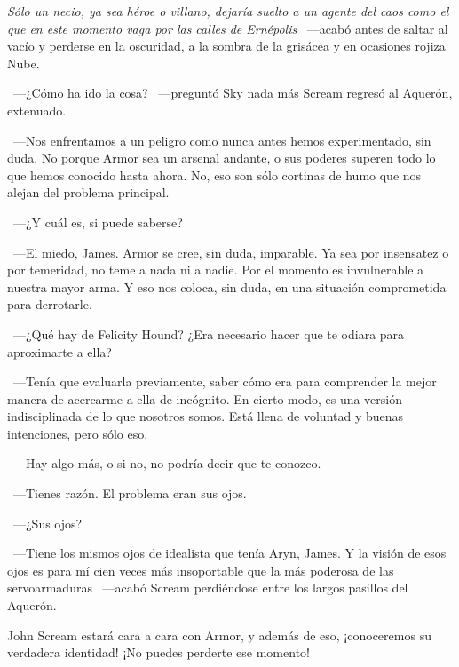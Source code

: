 \emph{Sólo un necio, ya sea héroe o villano, dejaría suelto a un agente del caos como el que en este momento vaga por las calles de Ernépolis} ~---acabó antes de saltar al vacío y perderse en la oscuridad, a la sombra de la grisácea y en ocasiones rojiza Nube.

\bigskip\noindent
~---¿Cómo ha ido la cosa? ~---preguntó Sky nada más Scream regresó al Aquerón, extenuado.

~---Nos enfrentamos a un peligro como nunca antes hemos experimentado, sin duda. No porque Armor sea un arsenal andante, o sus poderes superen todo lo que hemos conocido hasta ahora. No, eso son sólo cortinas de humo que nos alejan del problema principal.

~---¿Y cuál es, si puede saberse?

~---El miedo, James. Armor se cree, sin duda, imparable. Ya sea por insensatez o por temeridad, no teme a nada ni a nadie. Por el momento es invulnerable a nuestra mayor arma. Y eso nos coloca, sin duda, en una situación comprometida para derrotarle.

~---¿Qué hay de Felicity Hound? ¿Era necesario hacer que te odiara para aproximarte a ella?

~---Tenía que evaluarla previamente, saber cómo era para comprender la mejor manera de acercarme a ella de incógnito. En cierto modo, es una versión indisciplinada de lo que nosotros somos. Está llena de voluntad y buenas intenciones, pero sólo eso.

~---Hay algo más, o si no, no podría decir que te conozco.

~---Tienes razón. El problema eran sus ojos.

~---¿Sus ojos?

~---Tiene los mismos ojos de idealista que tenía Aryn, James. Y la visión de esos ojos es para mí cien veces más insoportable que la más poderosa de las servoarmaduras ~---acabó Scream perdiéndose entre los largos pasillos del Aquerón.

\begin{next}
    John Scream estará cara a cara con Armor, y además de eso, ¡conoceremos su verdadera identidad! ¡No puedes perderte ese momento!
\end{next}

\endinput
